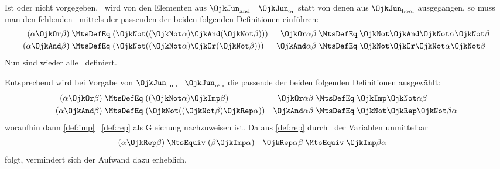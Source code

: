 {Ist \chrqt{\OjkOr} oder \chrqt{\OjkAnd} nicht vorgegeben, \textdh\ wird von den Elementen aus $\OjkJun_{\RawMtsIdxAnd}$ \textbzgl\ $\OjkJun_{\RawMtsIdxOr}$ statt von denen aus $\OjkJun_\RawMtsIdxBool$ ausgegangen, so muss man den fehlenden \Junktor\ mittels der passenden der beiden folgenden Definitionen einführen:
\begin{align}
(\alpha \OjkOr \beta)  & \;\MtsDefEq\; (\OjkNot((\OjkNot\alpha)\OjkAnd(\OjkNot\beta))) &
\OjkOr \alpha  \beta   & \;\MtsDefEq\;  \OjkNot \OjkAnd \OjkNot \alpha \OjkNot \beta
\label{def:orand} \\
(\alpha \OjkAnd \beta) & \;\MtsDefEq\; (\OjkNot((\OjkNot\alpha)\OjkOr(\OjkNot\beta)))  &
\OjkAnd \alpha  \beta  & \;\MtsDefEq\;  \OjkNot \OjkOr \OjkNot \alpha \OjkNot \beta
\label{def:andor}
\end{align}
Nun sind wieder alle \Junktoren\ definiert.

Entsprechend wird bei Vorgabe von $\OjkJun_{\RawMtsIdxImp}$ \textbzgl\ $\OjkJun_{\RawMtsIdxRep}$ die passende der beiden folgenden Definitionen ausgewählt:
\begin{align}
(\alpha \OjkOr  \beta) & \;\MtsDefEq\; ((\OjkNot \alpha) \OjkImp \beta)         &
\OjkOr \alpha   \beta  & \;\MtsDefEq\;   \OjkImp \OjkNot \alpha \beta
\label{def:orrep}
\\
(\alpha \OjkAnd \beta) & \;\MtsDefEq\; (\OjkNot ((\OjkNot \beta) \OjkRep \alpha)) &
\OjkAnd \alpha  \beta  & \;\MtsDefEq\;  \OjkNot \OjkRep \OjkNot \beta \alpha
\label{def:andrep}
\end{align}
woraufhin dann \eqref{def:imp} \textbzgl\ \eqref{def:rep} als Gleichung nachzuweisen ist.
Da aus \eqref{def:rep} durch \Vertauschung\ der Variablen unmittelbar
\begin{align}
(\alpha \OjkRep \beta) & \;\MtsEquiv\; (\beta \OjkImp \alpha) &
\OjkRep \alpha  \beta  & \;\MtsEquiv\;  \OjkImp \beta \alpha  \label{eq:repimp}
\end{align}
folgt, vermindert sich der Aufwand dazu erheblich.

}

